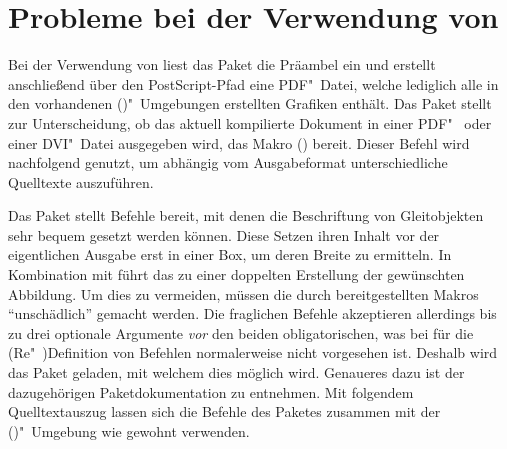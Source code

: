 \section{Probleme bei der Verwendung von }
%
Bei der Verwendung von  liest das Paket  
die Präambel ein und erstellt anschließend über den PostScript-Pfad 
 eine PDF"~Datei, welche lediglich alle in den 
vorhandenen ()"~Umgebungen erstellten 
Grafiken enthält. Das Paket  stellt zur Unterscheidung, ob das 
aktuell kompilierte Dokument in einer PDF"~ oder einer DVI"~Datei ausgegeben 
wird, das Makro () bereit. Dieser Befehl wird 
nachfolgend genutzt, um abhängig vom Ausgabeformat unterschiedliche Quelltexte 
auszuführen.
%
\begin{quoting}
\begin{Code}
\usepackage{iftex}
\end{Code}
\end{quoting}

Das Paket  stellt Befehle bereit, mit denen die Beschriftung 
von Gleitobjekten sehr bequem gesetzt werden können. Diese Setzen ihren Inhalt 
vor der eigentlichen Ausgabe erst in einer Box, um deren Breite zu ermitteln. 
In Kombination mit  führt das zu einer doppelten 
Erstellung der gewünschten Abbildung. Um dies zu vermeiden, müssen die durch 
 bereitgestellten Makros \enquote{unschädlich} gemacht 
werden. Die fraglichen Befehle akzeptieren allerdings bis zu drei optionale 
Argumente \emph{vor} den beiden obligatorischen, was bei  für die 
(Re"~)Definition von Befehlen normalerweise nicht vorgesehen ist. Deshalb wird 
das Paket  geladen, mit welchem dies möglich wird. Genaueres 
dazu ist der dazugehörigen Paketdokumentation zu entnehmen. Mit folgendem 
Quelltextauszug lassen sich die Befehle des Paketes  zusammen 
mit der ()"~Umgebung wie gewohnt 
verwenden.
%
\begin{quoting}
\begin{Code}
\usepackage{floatrow}
\usepackage{xparse}
\ifpdf\else
\fi
\end{Code}
\end{quoting}

